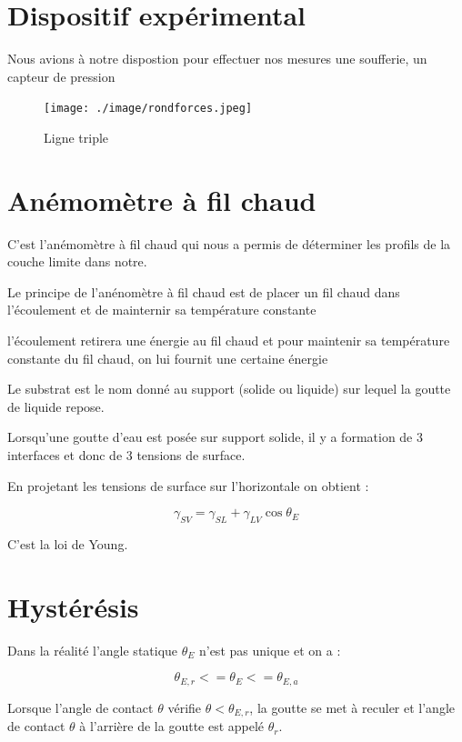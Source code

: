 \documentclass[french]{article}
\begin{document}
\section{Dispositif expérimental}
Nous avions à notre dispostion pour effectuer nos mesures une soufferie, un capteur de pression
\begin{figure}[ht]
	\centering
	\texttt{[image: ./image/rondforces.jpeg]}
	\caption{Ligne triple}
\end{figure}

\section{Anémomètre à fil chaud}
C'est l'anémomètre à fil chaud qui nous a permis de déterminer les profils de la couche limite dans notre.

Le principe de l'anénomètre à fil chaud est de placer un fil chaud dans l'écoulement et de mainternir sa température constante

l'écoulement retirera une énergie au fil chaud et pour maintenir sa température constante du fil chaud, on lui fournit une certaine énergie

Le substrat est le nom donné au support (solide ou liquide) sur lequel la goutte de liquide repose.

Lorsqu'une goutte d'eau est posée sur support solide, il y a formation de 3 interfaces et donc de 3 tensions de surface.


En projetant les tensions de surface sur l'horizontale on obtient :

\begin{equation}
	\label{eq:Young}
	\gamma_{SV}  = \gamma_{SL} + \gamma_{LV}\cos\theta_{E}
\end{equation}

C'est la loi de Young.

\section{Hystérésis}


Dans la réalité l'angle statique $\theta_{E}$ n'est pas unique et on a :


\begin{equation}
	\theta_{E,r} <= \theta_{E} <= \theta_{E,a}
\end{equation}

Lorsque l'angle de contact $\theta$ vérifie $\theta < \theta_{E,r}$, la goutte se met à reculer et l'angle de contact $\theta$ à l'arrière de la goutte est appelé $\theta_{r}$.\\
\end{document}
